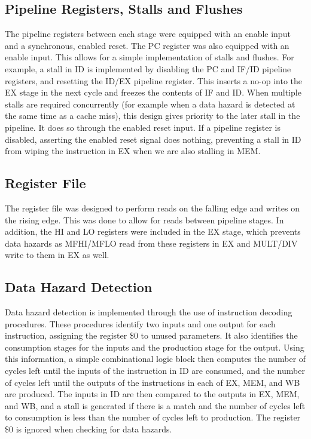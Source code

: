 \documentclass[conference,hidelinks]{IEEEtran}
\begin{document}
\subsection{Pipeline Registers, Stalls and Flushes}

The pipeline registers between each stage were equipped with an enable input and a synchronous, enabled reset. The PC register was also equipped with an enable input. This allows for a simple implementation of stalls and flushes. For example, a stall in ID is implemented by disabling the PC and IF/ID pipeline registers, and resetting the ID/EX pipeline register. This inserts a no-op into the EX stage in the next cycle and freezes the contents of IF and ID. When multiple stalls are required concurrently (for example when a data hazard is detected at the same time as a cache miss), this design gives priority to the later stall in the pipeline. It does so through the enabled reset input. If a pipeline register is disabled, asserting the enabled reset signal does nothing, preventing a stall in ID from wiping the instruction in EX when we are also stalling in MEM.

\subsection{Register File}

The register file was designed to perform reads on the falling edge and writes on the rising edge. This was done to allow for reads between pipeline stages. In addition, the HI and LO registers were included in the EX stage, which prevents data hazards as MFHI/MFLO read from these registers in EX and MULT/DIV write to them in EX as well.

\subsection{Data Hazard Detection}

Data hazard detection is implemented through the use of instruction decoding procedures. These procedures identify two inputs and one output for each instruction, assigning the register \$0 to unused parameters. It also identifies the consumption stages for the inputs and the production stage for the output. Using this information, a simple combinational logic block then computes the number of cycles left until the inputs of the instruction in ID are consumed, and the number of cycles left until the outputs of the instructions in each of EX, MEM, and WB are produced. The inputs in ID are then compared to the outputs in EX, MEM, and WB, and a stall is generated if there is a match and the number of cycles left to consumption is less than the number of cycles left to production. The register \$0 is ignored when checking for data hazards.
\end{document}
